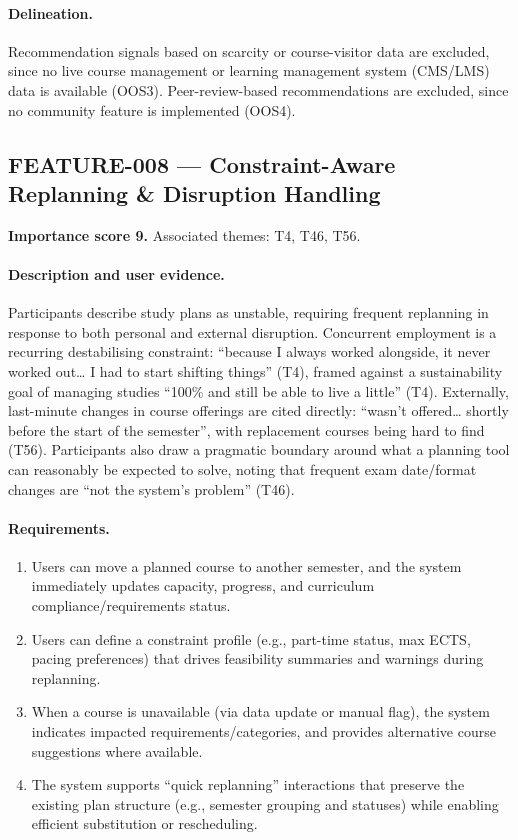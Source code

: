 \paragraph{Delineation.}
Recommendation signals based on scarcity or course-visitor data are excluded, since no live course management or learning management system (CMS/LMS) data is available (OOS3). Peer-review-based recommendations are excluded, since no community feature is implemented (OOS4).

\subsection{FEATURE-008 --- Constraint-Aware Replanning \& Disruption Handling}
\label{feat:008}
\textbf{Importance score 9.} Associated themes: T4, T46, T56.

\paragraph{Description and user evidence.}
Participants describe study plans as unstable, requiring frequent replanning in response to both personal and external disruption. Concurrent employment is a recurring destabilising constraint: \enquote{because I always worked alongside, it never worked out… I had to start shifting things} (T4), framed against a sustainability goal of managing studies \enquote{100\% and still be able to live a little} (T4). Externally, last-minute changes in course offerings are cited directly: \enquote{wasn't offered… shortly before the start of the semester}, with replacement courses being hard to find (T56). Participants also draw a pragmatic boundary around what a planning tool can reasonably be expected to solve, noting that frequent exam date/format changes are \enquote{not the system's problem} (T46).

\paragraph{Requirements.}
\begin{enumerate}
    \item Users can move a planned course to another semester, and the system immediately updates capacity, progress, and curriculum compliance/requirements status.
    \item Users can define a constraint profile (e.g., part-time status, max ECTS, pacing preferences) that drives feasibility summaries and warnings during replanning.
    \item When a course is unavailable (via data update or manual flag), the system indicates impacted requirements/categories, and provides alternative course suggestions where available.
    \item The system supports \enquote{quick replanning} interactions that preserve the existing plan structure (e.g., semester grouping and statuses) while enabling efficient substitution or rescheduling.
\end{enumerate}

